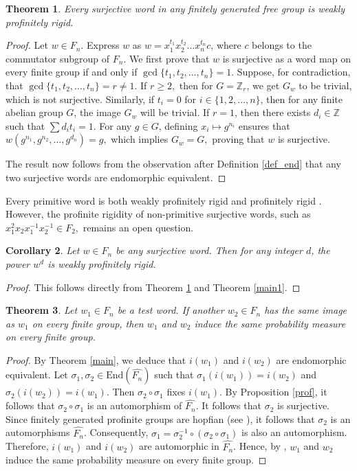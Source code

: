 \documentclass[12pt]{amsart}
\def \Z {{\mathbb{Z}}}
\newtheorem{theorem}{Theorem}[section]
\newtheorem{cor}[theorem]{Corollary}
\begin{document}
\begin{theorem}\label{prim}
    Every surjective word in any finitely generated free group is weakly profinitely rigid.
\end{theorem}

\begin{proof}
    Let $w \in F_n$. Express $w$ as $w = x_1^{t_1}x_2^{t_2}\ldots x_n^{t_n}c$, where $c$ belongs to the commutator subgroup of $F_n$. We first prove that $w$ is surjective as a word map on every finite group if and only if $\gcd\{t_1,t_2,\ldots,t_n\}=1$. Suppose, for contradiction, that $\gcd\{t_1,t_2,\ldots,t_n\} = r \neq 1$.  If $r \geq 2,$ then for $G = \Z_r$, we get $G_w$ to be trivial, which is not surjective. Similarly, if $t_i = 0$ for $i \in \{1,2,\ldots,n\}$, then for any finite abelian group $G$, the image $G_w$ will be trivial. If $r = 1$, then there exists $d_i \in \Z$ such that $\sum d_it_i = 1$. For any $g \in G$, defining $x_i \mapsto g^{n_i}$ ensures that $w(g^{n_1}, g^{n_2},\ldots,g^{d_n}) = g,$ which implies $G_w = G,$ proving that $w$ is surjective. 
    
    The result now follows from the observation after Definition \ref{def_end} that any two surjective words are endomorphic equivalent.
\end{proof}

Every primitive word is both weakly profinitely rigid and profinitely rigid \cite{puder2015measure}. However, the profinite rigidity of non-primitive surjective words, such as $x_1^2x_2x_1^{-1}x_2^{-1} \in F_2,$ remains an open question.
\begin{cor}
   Let $w \in F_n$ be any surjective word. Then for any integer $d$, the power $w^d$ is weakly profinitely rigid.  
\end{cor}
\begin{proof}
    This follows directly from Theorem \ref{prim} and Theorem \ref{main1}.
\end{proof}

\begin{theorem}\label{main2}
    Let $w_1 \in F_n$ be a test word. If another $w_2 \in F_n$ has the same image as $w_1$ on every finite group, then $w_1$  and $w_2$ induce the same probability measure on every finite group. 
\end{theorem}
\begin{proof}
    By Theorem \ref{main}, we deduce that $i(w_1)$ and $i(w_2)$ are endomorphic equivalent. Let $\sigma_1, \sigma_2 \in \mathrm{End}(\widehat{F_n})$ such that $\sigma_1(i(w_1)) = i(w_2)$ and $\sigma_2(i(w_2)) = i(w_1)$. Then $\sigma_2 \circ \sigma_1$ fixes $i(w_1)$. By Proposition \ref{prof}, it follows that $\sigma_2 \circ \sigma_1$ is an automorphism of $\widehat{F_n}$. It follows that $\sigma_2$ is surjective. Since finitely generated profinite groups are hopfian (see \cite[Proposition~2.5.1]{ribes2000profinite}), it follows that $\sigma_2 $ is an automorphisms $\widehat{F_n}$. Consequently, $\sigma_1 = \sigma_2^{-1} \circ (\sigma_2 \circ \sigma_1)$ is also an automorphism. Therefore, $i(w_1)$ and $i(w_2)$ are automorphic in $\widehat{F_n}$. Hence, by \cite[Theorem~2.2]{hanany2020some}, $w_1$ and $w_2$ induce the same probability measure on every finite group. 
\end{proof}
\end{document}
